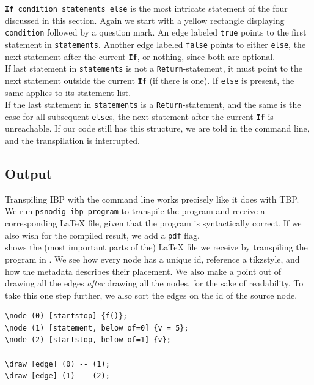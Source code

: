\texttt{\textbf{If} condition statements else} is the most intricate statement of the four discussed in this section. Again we start with a yellow rectangle displaying \texttt{condition} followed by a question mark. An edge labeled \texttt{true} points to the first statement in \texttt{statements}. Another edge labeled \texttt{false} points to either \texttt{else}, the next statement after the current \texttt{\textbf{If}}, or nothing, since both are optional. \\

If last statement in \texttt{statements} is not a \texttt{Return}-statement, it must point to the next statement outside the current \texttt{\textbf{If}} (if there is one). If \texttt{else} is present, the same applies to its statement list. \\

If the last statement in \texttt{statements} is a \texttt{Return}-statement, and the same is the case for all subsequent \texttt{else}s, the next statement after the current \texttt{\textbf{If}} is unreachable. If our code still has this structure, we are told in the command line, and the transpilation is interrupted. \\


\subsection{Output}

Transpiling IBP with the command line works precisely like it does with TBP. We run \texttt{psnodig ibp program} to transpile the program and receive a corresponding LaTeX file, given that the program is syntactically correct. If we also wish for the compiled result, we add a \texttt{pdf} flag. \\

 shows the (most important parts of the) LaTeX file we receive by transpiling the program in . We see how every node has a unique id, reference a tikzstyle, and how the metadata describes their placement. We also make a point out of drawing all the edges \textit{after} drawing all the nodes, for the sake of readability. To take this one step further, we also sort the edges on the id of the source node. \\

\begin{lstlisting}[caption={Excerpt of the LaTeX from transpiling \Cref{Gourmet f} to IBP.}, captionpos=b, label={Example output from compiling Flowchart}]
\node (0) [startstop] {f()};
\node (1) [statement, below of=0] {v = 5};
\node (2) [startstop, below of=1] {v};

\draw [edge] (0) -- (1);
\draw [edge] (1) -- (2);
\end{lstlisting}
